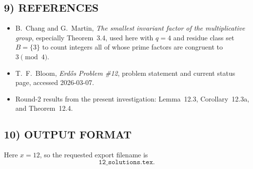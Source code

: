 \subsection*{9) REFERENCES}

\begin{itemize}
\item B.~Chang and G.~Martin, \emph{The smallest invariant factor of the multiplicative group}, especially Theorem~3.4, used here with $q=4$ and residue class set $B=\{3\}$ to count integers all of whose prime factors are congruent to $3\pmod 4$.
\item T.~F.~Bloom, \emph{Erd\H{o}s Problem \#12}, problem statement and current status page, accessed 2026-03-07.
\item Round-2 results from the present investigation: Lemma~12.3, Corollary~12.3a, and Theorem~12.4.
\end{itemize}

\subsection*{10) OUTPUT FORMAT}

Here $x=12$, so the requested export filename is
\[
\texttt{12\_solutions.tex}.
\]
